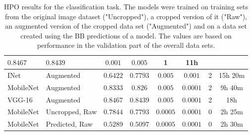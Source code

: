 \begin{landscape}
\begin{table}[!ht]
\begin{tabular}{|l|l|c|c|c|c|c|c|}
        $0.8467$ &
        $0.8439$ &
        $0.001$ &
        $0.005$ &
        1 &
        11h
        \\
        \hline
        \hline
        INet & Augmented & $0.6422$ & $0.7793$
        &
        $0.005$ &
        $0.001$ &
        2 &
        15h 20m\\
        \hline
        MobileNet &
        Augmented &
        $0.8333$ &
        $0.826$ &
        $0.005$ &
        $0.0001$ &
        2 &
        9h 40m\\
        \hline
        VGG-16 &
        Augmented &
        $0.8467$ &
        $0.8439$ &
        $0.005$ &
        $0.0001$ &
        2 &
        18h\\
        \hline
        \hline
        MobileNet \label{res:mobilenet-uncropped} &
        Uncropped, Raw
         &
        $0.7844$ &
        $0.7793$ &
        $0.0005$ &
        $0.0001$ &
        0 &
        2h 25m
        \\
        \hline
        \hline
        MobileNet \label{res:mobilenet-predicted} &
        Predicted, Raw
         &
        $0.5289$ & $0.5097$ &
        $0.0005$ & $0.0001$ & 0 & 2h 30m\\
        \hline
    \end{tabular}
    \caption{HPO results for the classification task. The models were trained on training sets from the original image dataset ("Uncropped"), a cropped version of it ("Raw"), an augmented version of the cropped data set ("Augmented") and on a data set created using the BB predictions of a model. The values are based on performance in the validation part of the overall data sets.}
    \label{fig:classification-results}
\end{table}

\end{landscape}
